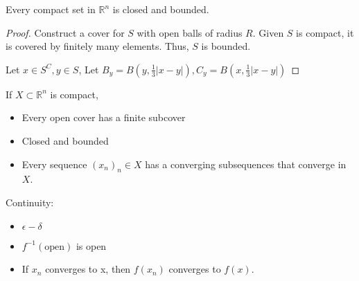 \documentclass[a4paper]{article}
\numberwithin{equation}{section}
\newcommand{\R}{\mathbb{R}}
\begin{document}
\begin{theorem}
    Every compact set in $\R^n$ is closed and bounded.
    \begin{proof}
        Construct a cover for $S$ with open balls of radius $R$. Given $S$ is compact, it is covered by finitely many elements. Thus, $S$ is bounded.
        
        Let $x\in S^C, y\in S$, Let $B_y=B(y,\frac{1}{3}|x-y|),C_y=B(x,\frac{1}{3}|x-y|)$
    \end{proof}
\end{theorem}

If $X\subset\R^n$ is compact, 
\begin{itemize}
    \item Every open cover has a finite subcover
    \item Closed and bounded
    \item Every sequence $(x_n)_n\in X$ has a converging subsequences that converge in $X$.
\end{itemize}

Continuity:
\begin{itemize}
    \item $\epsilon-\delta$
    \item $f^{-1}(\text{open})$ is open
    \item If $x_n$ converges to x, then $f(x_n)$ converges to $f(x)$.
\end{itemize}
\end{document}
